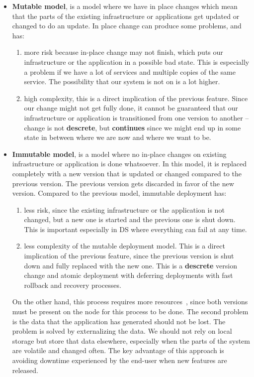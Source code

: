 \begin{itemize}
	\item \textbf{Mutable model}, is a model where we have in place changes which mean that the parts of the existing infrastructure or applications get updated or changed to do an update. In place change can produce some problems, and has: 
	
	\begin{enumerate}[start=1,label={(\bfseries \arabic*)}]
		\item more risk because in-place change may not finish, which puts our infrastructure or the application in a possible bad state. This is especially a problem if we have a lot of services and multiple copies of the same service. The possibility that our system is not on is a lot higher.
		\item high complexity, this is a direct implication of the previous feature. Since our change might not get fully done, it cannot be guaranteed that our infrastructure or application is transitioned from one version to another -- change is not \textbf{descrete}, but \textbf{continues} since we might end up in some state in between where we are now and where we want to be.
	\end{enumerate}
	
	\item \textbf{Immutable model}, is a model where no in-place changes on existing infrastructure or application is done whatsoever. In this model, it is replaced completely with a new version that is updated or changed compared to the previous version. The previous version gets discarded in favor of the new version. Compared to the previous model, immutable deployment has: 
	
	\begin{enumerate}[start=1,label={(\bfseries \arabic*)}]
		\item less risk, since the existing infrastructure or the application is not changed, but a new one is started and the previous one is shut down. This is important especially in DS where everything can fail at any time.
		\item less complexity of the mutable deployment model. This is a direct implication of the previous feature, since the previous version is shut down and fully replaced with the new one. This is a \textbf{descrete} version change and atomic deployment with deferring deployments with fast rollback and recovery processes. 
	\end{enumerate}
	
	On the other hand, this process requires more resources~\cite{Helland16}, since both versions must be present on the node for this process to be done. The second problem is the data that the application has generated should not be lost. The problem is solved by externalizing the data. We should not rely on local storage but store that data elsewhere, especially when the parts of the system are volatile and changed often. The key advantage of this approach is avoiding downtime experienced by the end-user when new features are released.
\end{itemize}

